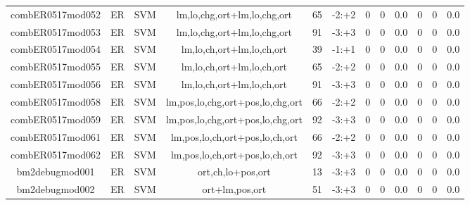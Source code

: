 \documentclass[a4paper]{article}
\begin{document}
\begin{landscape}
\begin{center}
\begin{tabular}{ |c|c|c|c|c|c|c|c|c|c|c|c|}
 
 	
 	\small{ combER0517mod052 } & ER & SVM & lm,lo,chg,ort+lm,lo,chg,ort  &  65 &  -2:+2  &  0 & 0 & 0.0  &  0 & 0 & 0.0 \\
 	

 
 	
 	\small{ combER0517mod053 } & ER & SVM & lm,lo,chg,ort+lm,lo,chg,ort  &  91 &  -3:+3  &  0 & 0 & 0.0  &  0 & 0 & 0.0 \\
 	

 
 	
 	\small{ combER0517mod054 } & ER & SVM & lm,lo,ch,ort+lm,lo,ch,ort  &  39 &  -1:+1  &  0 & 0 & 0.0  &  0 & 0 & 0.0 \\
 	

 
 	
 	\small{ combER0517mod055 } & ER & SVM & lm,lo,ch,ort+lm,lo,ch,ort  &  65 &  -2:+2  &  0 & 0 & 0.0  &  0 & 0 & 0.0 \\
 	

 
 	
 	\small{ combER0517mod056 } & ER & SVM & lm,lo,ch,ort+lm,lo,ch,ort  &  91 &  -3:+3  &  0 & 0 & 0.0  &  0 & 0 & 0.0 \\
 	

 
 	
 	\small{ combER0517mod058 } & ER & SVM & lm,pos,lo,chg,ort+pos,lo,chg,ort  &  66 &  -2:+2  &  0 & 0 & 0.0  &  0 & 0 & 0.0 \\
 	

 
 	
 	\small{ combER0517mod059 } & ER & SVM & lm,pos,lo,chg,ort+pos,lo,chg,ort  &  92 &  -3:+3  &  0 & 0 & 0.0  &  0 & 0 & 0.0 \\
 	

 
 	
 	\small{ combER0517mod061 } & ER & SVM & lm,pos,lo,ch,ort+pos,lo,ch,ort  &  66 &  -2:+2  &  0 & 0 & 0.0  &  0 & 0 & 0.0 \\
 	

 
 	
 	\small{ combER0517mod062 } & ER & SVM & lm,pos,lo,ch,ort+pos,lo,ch,ort  &  92 &  -3:+3  &  0 & 0 & 0.0  &  0 & 0 & 0.0 \\
 	

 
 	
 	\small{ bm2debugmod001 } & ER & SVM & ort,ch,lo+pos,ort  &  13 &  -3:+3  &  0 & 0 & 0.0  &  0 & 0 & 0.0 \\
 	

 
 	
 	\small{ bm2debugmod002 } & ER & SVM & ort+lm,pos,ort  &  51 &  -3:+3  &  0 & 0 & 0.0  &  0 & 0 & 0.0 \\
 	


\end{tabular}
\end{center}
\end{landscape}
\end{document}
